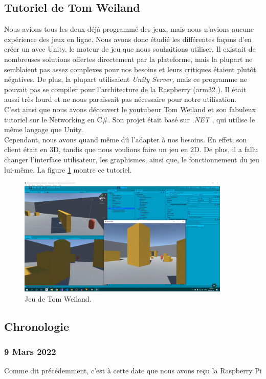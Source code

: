 \documentclass[a4paper]{article}
\begin{document}
\subsection{Tutoriel de Tom Weiland}
Nous avions tous les deux déjà programmé des jeux, mais nous n'avions aucune expérience des jeux en ligne. Nous avons donc étudié les différentes façons d'en créer un avec Unity, le moteur de jeu que nous souhaitions utiliser. Il existait de nombreuses solutions offertes directement par la plateforme, mais la plupart ne semblaient pas assez complexes pour nos besoins et leurs critiques étaient plutôt négatives. De plus, la plupart utilisaient \textit{Unity Server,} mais ce programme ne pouvait pas se compiler pour l'architecture de la Raspberry (arm32 \cite{arm32}). Il était aussi très lourd et ne nous paraissait pas nécessaire pour notre utilisation.\\
C'est ainsi que nous avons découvert le youtubeur Tom Weiland et son fabuleux tutoriel \cite{tomweiland} sur le Networking en C\#. Son projet était basé sur \textit{.NET} \cite{dotnet}, qui utilise le même langage que Unity.  \\
Cependant, nous avons quand même dû l'adapter à nos besoins. En effet, son client était en 3D, tandis que nous voulions faire un jeu en 2D. De plus, il a fallu changer l'interface utilisateur, les graphismes, ainsi que, le fonctionnement du jeu lui-même. La figure \ref{fig:tutorial} montre ce tutoriel.
\begin{figure}
	\centering
    \includegraphics[width=0.9\textwidth]{images/tutorial.png}
    \caption{Jeu de Tom Weiland.}
    \label{fig:tutorial}
\end{figure}

\subsection{Chronologie}
\subsubsection{9 Mars 2022}
Comme dit précédemment, c'est à cette date que nous avons reçu la Raspberry Pi
\end{document}
